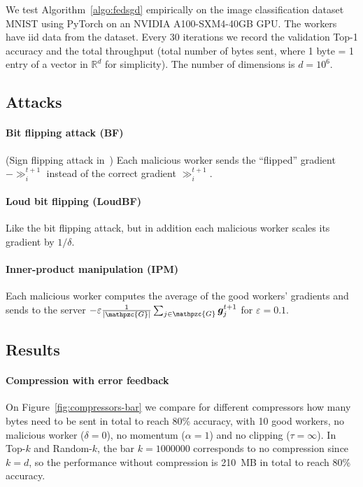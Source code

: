 \documentclass{article}
\newcommand{\gset}{\ensuremath{{\mathpzc{G}}}}
\begin{document}
We test Algorithm~\ref{algo:fedsgd} empirically on the image classification dataset MNIST \parencite{MNIST} using PyTorch on an NVIDIA A100-SXM4-40GB GPU. The workers have iid data from the dataset. Every 30 iterations we record the validation Top-1 accuracy and the total throughput (total number of bytes sent, where 1 byte = 1 entry of a vector in $\mathbb R^d$ for simplicity). The number of dimensions is $d=10^6$. %


\subsection{Attacks}


\paragraph{Bit flipping attack (BF)} (Sign flipping attack in~\cite{ByzantineResilient}) Each malicious worker sends the ``flipped'' gradient $-\gg_i^{t+1}$ instead of the correct gradient $\gg_i^{t+1}$. 

\paragraph*{Loud bit flipping (LoudBF)} Like the bit flipping attack, but in addition each malicious worker scales its gradient by $1/\delta$.

\paragraph{Inner-product manipulation (IPM)} \parencite{InnerProductManipulation} Each malicious worker computes the average of the good workers' gradients and sends to the server $-\varepsilon \tfrac{1}{|\gset|} \tsum_{j\in\gset} \gg_j^{t+1}$ for $\varepsilon = 0.1$.


\subsection{Results}


\paragraph{Compression with error feedback}

On Figure~\ref{fig:compressors-bar} we compare for different compressors how many bytes need to be sent in total to reach 80\% accuracy, with 10 good workers, no malicious worker ($\delta=0$), no momentum ($\alpha=1$) and no clipping ($\tau=\infty$). In Top-$k$ and Random-$k$, the bar $k=1000000$ corresponds to no compression since $k=d$, so the performance without compression is 210~MB in total to reach 80\% accuracy.
\end{document}
